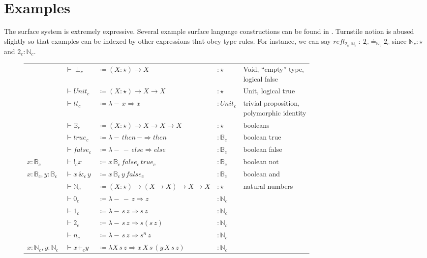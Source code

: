 \section{Examples}

The surface system is extremely expressive.
Several example surface language constructions can be found in .
Turnstile notion is abused slightly so that examples can be indexed by other expressions that obey type rules.
For instance, we can say $refl_{2_{c}:\mathbb{N}_{c}}\ :\ 2_{c}\doteq_{\mathbb{N}_{c}}2_{c}$ since $\mathbb{N}_{c}:\star$ and $2_{c}:\mathbb{N}_{c}$.

\begin{sidewaysfigure}
\begin{tabular}{lllll}
  & $\vdash\perp_{c}$ & $\coloneqq\left(X:\star\right)\rightarrow X$ & $:\star$ & \makecell[l]{Void, ``empty'' type,\\ logical false}\tabularnewline
  & $\vdash Unit_{c}$ & $\coloneqq\left(X:\star\right)\rightarrow X\rightarrow X$ & $:\star$ & Unit, logical true\tabularnewline
  & $\vdash tt_{c}$ & $\coloneqq\lambda-\,x\Rightarrow x$ & $:Unit_{c}$ & \makecell[l]{trivial proposition,\\ polymorphic identity}\tabularnewline
  & $\vdash\mathbb{B}_{c}$ & $\coloneqq\left(X:\star\right)\rightarrow X\rightarrow X\rightarrow X$ & $:\star$ & booleans\tabularnewline
  & $\vdash true_{c}$ & $\coloneqq\lambda-\,then\,-\Rightarrow then$ & $:\mathbb{B}_{c}$ & boolean true\tabularnewline
  & $\vdash false_{c}$ & $\coloneqq\lambda-\,-\,else\Rightarrow else$ & $:\mathbb{B}_{c}$ & boolean false\tabularnewline
$x:\mathbb{B}_{c}$ & $\vdash!_{c}x$ & $\coloneqq x\,\mathbb{B}_{c}\,false_{c}\,true_{c}$ & $:\mathbb{B}_{c}$ & boolean not\tabularnewline
$x:\mathbb{B}_{c},y:\mathbb{B}_{c}$ & $\vdash x\,\&_{c}\,y$ & $\coloneqq x\,\mathbb{B}_{c}\,y\,false_{c}$ & $:\mathbb{B}_{c}$ & boolean and\tabularnewline
  & $\vdash\mathbb{N}_{c}$ & $\coloneqq\left(X:\star\right)\rightarrow(X\rightarrow X)\rightarrow X\rightarrow X$ & $:\star$ & natural numbers\tabularnewline
  & $\vdash0_{c}$ & $\coloneqq\lambda-\,-\,z\Rightarrow z$ & $:\mathbb{N}_{c}$ & \tabularnewline
  & $\vdash1_{c}$ & $\coloneqq\lambda-\,s\,z\Rightarrow s\,z$ & $:\mathbb{N}_{c}$ & \tabularnewline
  & $\vdash2_{c}$ & $\coloneqq\lambda-\,s\,z\Rightarrow s\left(s\,z\right)$ & $:\mathbb{N}_{c}$ & \tabularnewline
  & $\vdash n_{c}$ & $\coloneqq\lambda-\,s\,z\Rightarrow s^{n}\,z$ & $:\mathbb{N}_{c}$ & \tabularnewline
$x:\mathbb{N}_{c},y:\mathbb{N}_{c}$ & $\vdash x+_{c}y$ & $\coloneqq\lambda X\,s\,z\Rightarrow x\,X\,s\,\left(y\,X\,s\,z\right)$ & $:\mathbb{N}_{c}$ & \tabularnewline

\end{tabular}
\end{sidewaysfigure}
